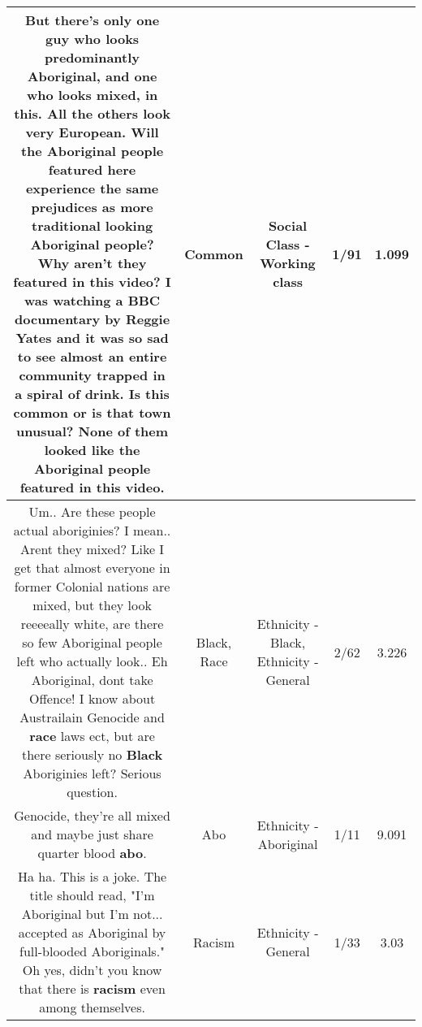 \documentclass[11pt]{article}
\newlength\mylength
\begin{document}
\begin{center}
\begin{longtable}{|C{.65\mylength}|C{.30\mylength}|C{.12\mylength}|C{.12\mylength}|C{.12\mylength}|}
  \small But there's only one guy who looks predominantly Aboriginal, and one who looks mixed, in this. All the others look very European. Will the Aboriginal people featured here experience the same prejudices as more traditional looking Aboriginal people? Why aren't they featured in this video? I was watching a BBC documentary by Reggie Yates and it was so sad to see almost an entire community trapped in a spiral of drink. Is this \textbf{common} or is that town unusual? None of them looked like the Aboriginal people featured in this video.\normalsize   & Common & Social Class - Working class & 1/91 & 1.099 \\  \hline
  \small Um.. Are these people actual aboriginies? I mean.. Arent they mixed? Like I get that almost everyone in former Colonial nations are mixed, but they look reeeeally white,  are there so few Aboriginal people left who actually look.. Eh Aboriginal, dont take Offence! I know about Austrailain Genocide and \textbf{race} laws ect, but are there seriously no \textbf{Black} Aboriginies left? Serious question.\normalsize   & Black, Race & Ethnicity - Black, Ethnicity - General & 2/62 & 3.226 \\  \hline
  \small Genocide, they're all mixed and maybe just share quarter blood \textbf{abo}.\normalsize   & Abo & Ethnicity - Aboriginal & 1/11 & 9.091 \\  \hline
  \small Ha ha. This is a joke.  The title should read, "I'm Aboriginal but I'm not... accepted as Aboriginal by full-blooded Aboriginals."  Oh yes, didn't you know that there is \textbf{racism} even among themselves.\normalsize   & Racism & Ethnicity - General & 1/33 & 3.03 \\  \hline

\end{longtable}
\end{center}
\end{document}
